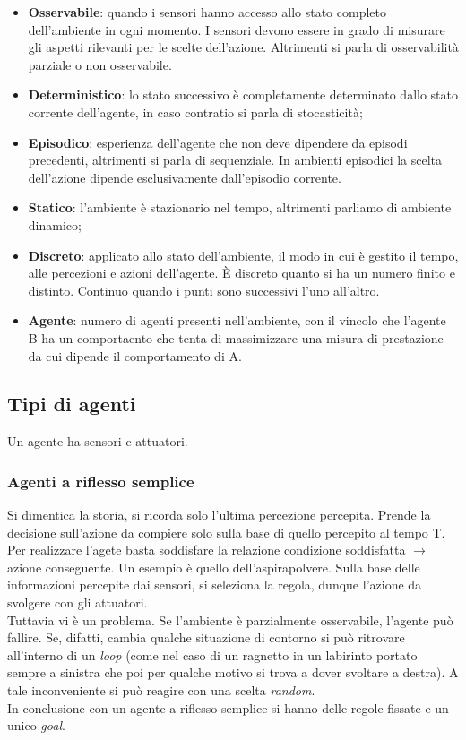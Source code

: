 \documentclass[10pt,a4paper]{book}
\begin{document}
\begin{itemize}
\item \textbf{Osservabile}: quando i sensori hanno accesso allo stato completo dell'ambiente in ogni momento. I sensori devono essere in grado di misurare gli aspetti rilevanti per le scelte dell'azione. Altrimenti si parla di osservabilit\`a parziale o non osservabile.
\item \textbf{Deterministico}: lo stato successivo \`e completamente determinato dallo stato corrente dell'agente, in caso contratio si parla di stocasticit\`a;
\item \textbf{Episodico}: esperienza dell'agente che non deve dipendere da episodi precedenti, altrimenti si parla di sequenziale. In ambienti episodici la scelta dell'azione dipende esclusivamente dall'episodio corrente.
\item \textbf{Statico}: l'ambiente \`e stazionario nel tempo, altrimenti parliamo di ambiente dinamico;
\item \textbf{Discreto}: applicato allo stato dell'ambiente, il modo in cui \`e gestito il tempo, alle percezioni e azioni dell'agente. \`E discreto quanto si ha un numero finito e distinto. Continuo quando i punti sono successivi l'uno all'altro.
\item \textbf{Agente}: numero di agenti presenti nell'ambiente, con il vincolo che l'agente B ha un comportaento che tenta di massimizzare una misura di prestazione da cui dipende il comportamento di A.
\end{itemize}
\subsection{Tipi di agenti}
Un agente ha sensori e attuatori.
\subsubsection{Agenti a riflesso semplice}
Si dimentica la storia, si ricorda solo l'ultima percezione percepita. Prende la decisione sull'azione da compiere solo sulla base di quello percepito al tempo T.\\
Per realizzare l'agete basta soddisfare la relazione condizione soddisfatta $\rightarrow$ azione conseguente. Un esempio \`e quello dell'aspirapolvere.
Sulla base delle informazioni percepite dai sensori, si seleziona la regola, dunque l'azione da svolgere con gli attuatori.\\
Tuttavia vi \`e un problema. Se l'ambiente \`e parzialmente osservabile, l'agente pu\`o fallire. Se, difatti, cambia qualche situazione di contorno si pu\`o ritrovare all'interno di un \textit{loop} (come nel caso di un ragnetto in un labirinto portato sempre a sinistra che poi per qualche motivo si trova a dover svoltare a destra). A tale inconveniente si pu\`o reagire con una scelta \textit{random}.\\
In conclusione con un agente a riflesso semplice si hanno delle regole fissate e un unico \textit{goal}.
\end{document}
